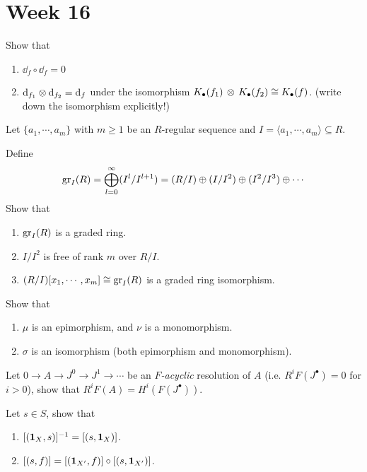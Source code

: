 
\section{Week 16}

\begin{exercise} Show that
  \begin{enumerate}
    \item $\dd_f \circ \dd_f = 0$
    \item $\mathrm{d}_{f_1} \otimes \mathrm{d}_{f_2} = \mathrm{d}_f$ under the isomorphism 
      $K_\bullet (f_1) \, \otimes\, K_\bullet(f_2) \cong K_\bullet(f)$.
      (write down the isomorphism explicitly!)
  \end{enumerate}
\end{exercise}

\begin{exercise}
  Let $\{ a_1, \cdots, a_m \}$ with $m \ge 1$ be an $R$-regular sequence
  and $I = \langle a_1, \cdots, a_m \rangle \subseteq R$.

  Define 
  $$\operatorname{gr}_I(R) = \bigoplus\limits_{l=0}^\infty (I^l / I^{l+1}) = 
  (R / I) \oplus (I / I^2) \oplus (I^2 / I^3) \oplus \cdots$$
  Show that
  \begin{enumerate}
    \item $\operatorname{gr}_I(R)$ is a graded ring.
    \item $I/I^2$ is free of rank $m$ over $R/I$.
    \item $(R/I)[x_1, \cdots, x_m] \cong \operatorname{gr}_I(R)$ is a graded ring isomorphism.
  \end{enumerate}
\end{exercise}

\begin{exercise}
  Show that 
  \begin{enumerate}
    \item $\mu$ is an epimorphism, and $\nu$ is a monomorphism.
    \item $\sigma$ is an isomorphism (both epimorphism and monomorphism).
  \end{enumerate}
\end{exercise}

\begin{exercise}
  Let $0 \to A \to J^0 \to J^1 \to \cdots$ be an {\it $F$-acyclic} resolution of $A$
  (i.e. $R^iF(J^\bullet) = 0$ for $i > 0$), show that $R^iF(A) = H^i(F(J^\bullet))$.
\end{exercise}

\begin{exercise}
  Let $s \in S$, show that
  \begin{enumerate}
    \item $[(\mathbf{1}_X, s)]^{-1} = [(s, \mathbf{1}_X)]$.
    \item $[(s, f)] = [(\mathbf{1}_{X'}, f)] \circ [(s, \mathbf{1}_{X'})]$.
  \end{enumerate}
\end{exercise}

